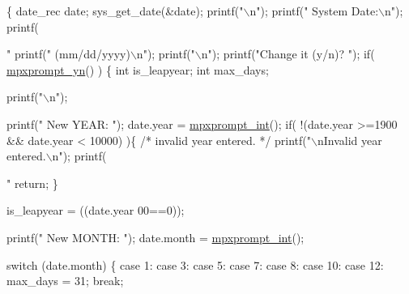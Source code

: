 \begin{DoxyCode}
                                          \{
        date\_rec date;
        sys\_get\_date(&date);
        printf(\textcolor{stringliteral}{"\(\backslash\)n"});
        printf(\textcolor{stringliteral}{"  System Date:\(\backslash\)n"});
        printf(\textcolor{stringliteral}{"    %
        printf(\textcolor{stringliteral}{"   (mm/dd/yyyy)\(\backslash\)n"});
        printf(\textcolor{stringliteral}{"\(\backslash\)n"});
        printf(\textcolor{stringliteral}{"Change it (y/n)? "});
        \textcolor{keywordflow}{if}( \hyperlink{mpx__util_8c_a8e31250a20e8bc8e7106f5a37c391199}{mpxprompt_yn}() ) \{
                \textcolor{keywordtype}{int} is\_leapyear;
                \textcolor{keywordtype}{int} max\_days;

                printf(\textcolor{stringliteral}{"\(\backslash\)n"});

                printf(\textcolor{stringliteral}{"  New YEAR:  "}); date.year      = \hyperlink{mpx__util_8c_aacc3dfe470919b0bd1133bce90383e18}{mpxprompt_int}();
                \textcolor{keywordflow}{if}( !(date.year >=1900 && date.year < 10000) )\{
                        \textcolor{comment}{/* invalid year entered. */}
                        printf(\textcolor{stringliteral}{"\(\backslash\)nInvalid year entered.\(\backslash\)n"});
                        printf(\textcolor{stringliteral}{"%
                        \textcolor{keywordflow}{return};
                \}

                is\_leapyear = ((date.year%
      00==0));

                printf(\textcolor{stringliteral}{"  New MONTH: "}); date.month     = \hyperlink{mpx__util_8c_aacc3dfe470919b0bd1133bce90383e18}{mpxprompt_int}();

                \textcolor{keywordflow}{switch} (date.month) \{
                        \textcolor{keywordflow}{case} 1:
                        \textcolor{keywordflow}{case} 3:
                        \textcolor{keywordflow}{case} 5:
                        \textcolor{keywordflow}{case} 7:
                        \textcolor{keywordflow}{case} 8:
                        \textcolor{keywordflow}{case} 10:
                        \textcolor{keywordflow}{case} 12:
                                max\_days = 31;
                        \textcolor{keywordflow}{break};

}}
\end{DoxyCode}
